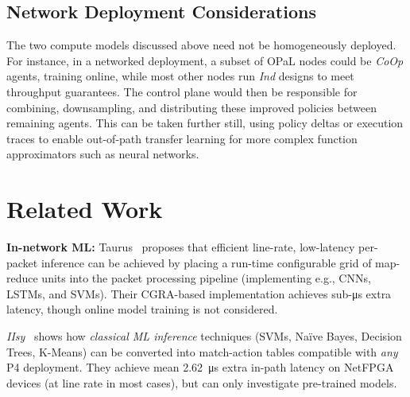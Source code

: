 \documentclass[
sigconf,natbib=false
]{acmart}
\newcommand{\fakepara}[1]{\noindent\textbf{#1:}}
\newcommand{\approachshort}{OPaL}
\newcommand{\Coopfw}{\emph{CoOp}}
\newcommand{\coopfw}{\Coopfw}
\newcommand{\Indfw}{\emph{Ind}}
\newcommand{\indfw}{\Indfw}
\begin{document}

\subsection{Network Deployment Considerations}
The two compute models discussed above need not be homogeneously deployed.
For instance, in a networked deployment, a subset of \approachshort{} nodes could be \coopfw{} agents, training online, while most other nodes run \indfw{} designs to meet throughput guarantees.
The control plane would then be responsible for combining, downsampling, and distributing these improved policies between remaining agents.
This can be taken further still, using policy deltas or execution traces to enable out-of-path transfer learning for more complex function approximators such as neural networks.

\section{Related Work}
\fakepara{In-network ML}
Taurus~\parencite{DBLP:journals/corr/abs-2002-08987} proposes that efficient line-rate, low-latency per-packet inference can be achieved by placing a run-time configurable grid of map-reduce units into the packet processing pipeline (implementing e.g., CNNs, LSTMs, and SVMs).
Their CGRA-based implementation achieves sub-\si{\micro\second} extra latency, though online model training is not considered.

\emph{IIsy}~\parencite{DBLP:conf/hotnets/XiongZ19} shows how \emph{classical ML inference} techniques (SVMs, Na\"{i}ve Bayes, Decision Trees, K-Means) can be converted into match-action tables compatible with \emph{any} P4 deployment.
They achieve mean \SI{2.62}{\micro\second} extra in-path latency on NetFPGA devices (at line rate in most cases), but can only investigate pre-trained models.
\end{document}
